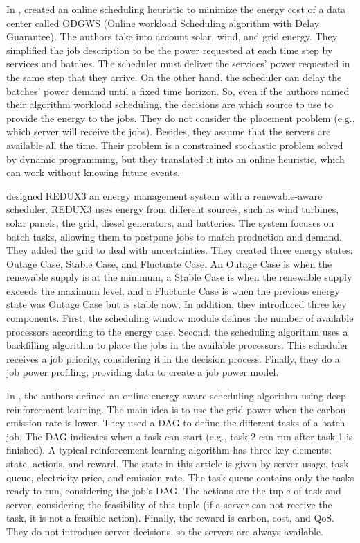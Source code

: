 In \cite{he2022online}, \citeauthor{he2022online} created an online scheduling heuristic to minimize the energy cost of a data center called ODGWS (Online workload Scheduling algorithm with Delay Guarantee). The authors take into account solar, wind, and grid energy. They simplified the job description to be the power requested at each time step by services and batches. The scheduler must deliver the services' power requested in the same step that they arrive. On the other hand, the scheduler can delay the batches' power demand until a fixed time horizon. So, even if the authors named their algorithm workload scheduling, the decisions are which source to use to provide the energy to the jobs. They do not consider the placement problem (e.g., which server will receive the jobs). Besides, they assume that the servers are available all the time. Their problem is a constrained stochastic problem solved by dynamic programming, but they translated it into an online heuristic, which can work without knowing future events.

\citeauthor{peng2022energy} designed REDUX3 an energy management system with a renewable-aware scheduler. REDUX3 uses energy from different sources, such as wind turbines, solar panels, the grid, diesel generators, and batteries. The system focuses on batch tasks, allowing them to postpone jobs to match production and demand. They added the grid to deal with uncertainties. They created three energy states: Outage Case, Stable Case, and Fluctuate Case. An Outage Case is when the renewable supply is at the minimum, a Stable Case is when the renewable supply exceeds the maximum level, and a Fluctuate Case is when the previous energy state was Outage Case but is stable now. In addition, they introduced three key components. First, the scheduling window module defines the number of available processors according to the energy case. Second, the scheduling algorithm uses a backfilling algorithm to place the jobs in the available processors. This scheduler receives a job priority, considering it in the decision process. Finally, they do a job power profiling, providing data to create a job power model.

In \cite{liu2023online}, the authors defined an online energy-aware scheduling algorithm using deep reinforcement learning. The main idea is to use the grid power when the carbon emission rate is lower. They used a DAG to define the different tasks of a batch job. The DAG indicates when a task can start (e.g., task 2 can run after task 1 is finished). A typical reinforcement learning algorithm has three key elements: state, actions, and reward. The state in this article is given by server usage, task queue, electricity price, and emission rate. The task queue contains only the tasks ready to run, considering the job's DAG. The actions are the tuple of task and server, considering the feasibility of this tuple (if a server can not receive the task, it is not a feasible action). Finally, the reward is carbon, cost, and QoS. They do not introduce server decisions, so the servers are always available.

